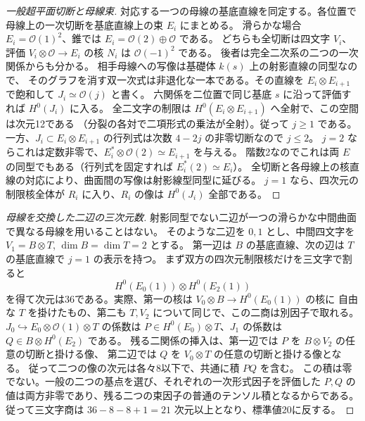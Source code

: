 \begin{proof}[一般超平面切断と母線束]
対応する一つの母線の基底直線を同定する。各位置で母線上の一次切断を基底直線上の束 $E_i$ にまとめる。
滑らかな場合 $E_i=\mathcal O(1)^2$、錐では $E_i=\mathcal O(2)\oplus\mathcal O$ である。
どちらも全切断は四文字 $V_i$、評価 $V_i\otimes\mathcal O\to E_i$ の核 $N_i$ は $\mathcal O(-1)^2$ である。
後者は完全二次系の二つの一次関係からも分かる。
相手母線への写像は基礎体 $k(s)$ 上の射影直線の同型なので、
そのグラフを消す双一次式は非退化な一本である。その直線を
$E_i\otimes E_{i+1}$ で飽和して $J_i\simeq\mathcal O(j)$ と書く。
六関係を二位置で同じ基底 $s$ に沿って評価すれば $H^0(J_i)$ に入る。
全二文字の制限は $H^0(E_i\otimes E_{i+1})$ へ全射で、この空間は次元12である
（分裂の各対で二項形式の乗法が全射）。従って $j\ge1$ である。
一方、$J_i\subset E_i\otimes E_{i+1}$ の行列式は次数 $4-2j$ の非零切断なので $j\le2$。
$j=2$ ならこれは定数非零で、$E_i^*\otimes\mathcal O(2)\simeq E_{i+1}$ を与える。
階数2なのでこれは両 $E$ の同型でもある（行列式を固定すれば $E_i^*(2)\simeq E_i$）。
全切断と各母線上の核直線の対応により、曲面間の写像は射影線型同型に延びる。
$j=1$ なら、四次元の制限核全体が $R_i$ に入り、$R_i$ の像は $H^0(J_i)$ 全部である。
\end{proof}

\begin{proof}[母線を交換した二辺の三次元数]
射影同型でない二辺が一つの滑らかな中間曲面で異なる母線を用いることはない。
そのような二辺を $0,1$ とし、中間四文字を $V_1=B\otimes T$, $\dim B=\dim T=2$ とする。
第一辺は $B$ の基底直線、次の辺は $T$ の基底直線で $j=1$ の表示を持つ。
まず双方の四次元制限核だけを三文字で割ると
\[
          H^0(E_0(1))\otimes H^0(E_2(1))
\]
を得て次元は36である。実際、第一の核は $V_0\otimes B\to H^0(E_0(1))$ の核に
自由な $T$ を掛けたもの、第二も $T,V_2$ について同じで、この二商は別因子で取れる。
$J_0\hookrightarrow E_0\otimes\mathcal O(1)\otimes T$ の係数は
$P\in H^0(E_0)\otimes T$、$J_1$ の係数は $Q\in B\otimes H^0(E_2)$ である。
残る二関係の挿入は、第一辺では $P$ を $B\otimes V_2$ の任意の切断と掛ける像、
第二辺では $Q$ を $V_0\otimes T$ の任意の切断と掛ける像となる。
従って二つの像の次元は各々8以下で、共通に積 $P Q$ を含む。
この積は零でない。一般の二つの基点を選び、それぞれの一次形式因子を評価した
$P,Q$ の値は両方非零であり、残る二つの束因子の普通のテンソル積となるからである。
従って三文字商は $36-8-8+1=21$ 次元以上となり、標準値20に反する。
\end{proof}

